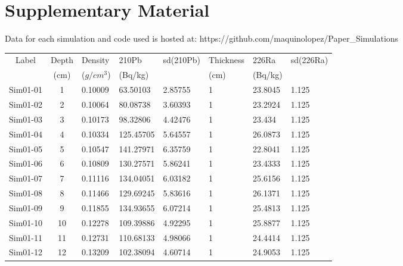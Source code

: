 \documentclass [10pt] {article}
\begin{document}
\section{Supplementary Material}
\label{sec:supp_mat}
Data for each simulation and code used is hosted at: https://github.com/maquinolopez/Paper\_Simulations
\newpage
\begin{table}[h]
	\begin{tabular}{c|cllllll}
		Label    & Depth & Density  & 210Pb & sd(210Pb) & Thickness& 226Ra  & sd(226Ra) \\
		& (cm) &($g/cm^3$) &(Bq/kg)& & (cm) & (Bq/kg)&\\
		\hline 
		Sim01-01 & 1          & 0.10009                         & 63.50103      & 2.85755   & 1              & 23.8045       & 1.125     \\
		Sim01-02 & 2          & 0.10064                         & 80.08738      & 3.60393   & 1              & 23.2924       & 1.125     \\
		Sim01-03 & 3          & 0.10173                         & 98.32806      & 4.42476   & 1              & 23.434        & 1.125     \\
		Sim01-04 & 4          & 0.10334                         & 125.45705     & 5.64557   & 1              & 26.0873       & 1.125     \\
		Sim01-05 & 5          & 0.10547                         & 141.27971     & 6.35759   & 1              & 22.8041       & 1.125     \\
		Sim01-06 & 6          & 0.10809                         & 130.27571     & 5.86241   & 1              & 23.4333       & 1.125     \\
		Sim01-07 & 7          & 0.11116                         & 134.04051     & 6.03182   & 1              & 25.6156       & 1.125     \\
		Sim01-08 & 8          & 0.11466                         & 129.69245     & 5.83616   & 1              & 26.1371       & 1.125     \\
		Sim01-09 & 9          & 0.11855                         & 134.93655     & 6.07214   & 1              & 25.4813       & 1.125     \\
		Sim01-10 & 10         & 0.12278                         & 109.39886     & 4.92295   & 1              & 25.8877       & 1.125     \\
		Sim01-11 & 11         & 0.12731                         & 110.68133     & 4.98066   & 1              & 24.4414       & 1.125     \\
		Sim01-12 & 12         & 0.13209                         & 102.38094     & 4.60714   & 1              & 24.9053       & 1.125     \\

\end{tabular}
\end{table}
\end{document}

